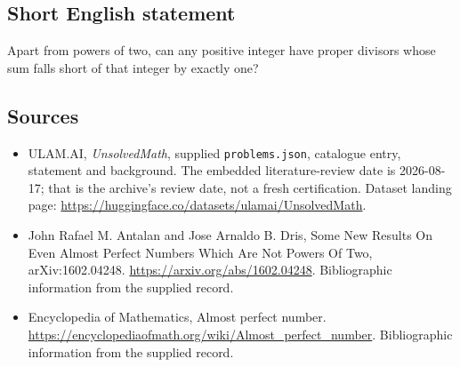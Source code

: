 \documentclass[11pt,a4paper]{article}
\begin{document}
\subsection{Short English statement}

Apart from powers of two, can any positive integer have proper divisors whose sum falls short of that integer by exactly one?

\subsection{Sources}

{\small

\begin{itemize}

\item[\hypertarget{source:statement:1}{S1}] ULAM.AI, \emph{UnsolvedMath}, supplied \texttt{problems.json}, catalogue entry, statement and background. The embedded literature-review date is 2026-08-17; that is the archive’s review date, not a fresh certification. Dataset landing page: \url{https://huggingface.co/datasets/ulamai/UnsolvedMath}.

\item[\hypertarget{source:statement:2}{S2}] John Rafael M. Antalan and Jose Arnaldo B. Dris, Some New Results On Even Almost Perfect Numbers Which Are Not Powers Of Two, arXiv:1602.04248. \url{https://arxiv.org/abs/1602.04248}. Bibliographic information from the supplied record.

\item[\hypertarget{source:statement:3}{S3}] Encyclopedia of Mathematics, Almost perfect number. \url{https://encyclopediaofmath.org/wiki/Almost_perfect_number}. Bibliographic information from the supplied record.

\end{itemize}

}

\label{end:statement}
\end{document}
